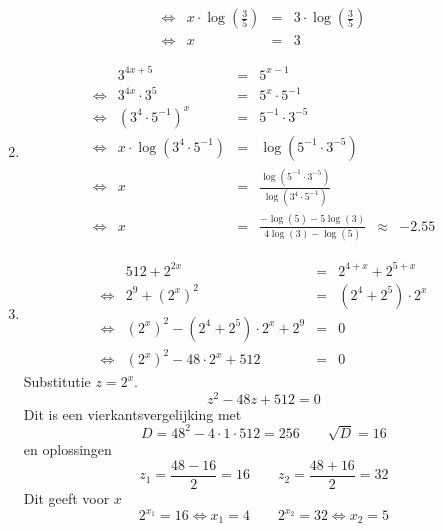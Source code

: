 \begin{oef}
\begin{opl}
\begin{enumerate}
\[\begin{array}{rrclcl}
            \iff & \displaystyle x \cdot \log\left(\frac{3}{5}\right) & = & \displaystyle 3 \cdot \log\left(\frac{3}{5}\right) \\[2mm]
            \iff & x & = & 3 
          \end{array}
        \]
  \item \[
          \begin{array}{rrclcl}
                 & 3^{4x+5} & = & 5^{x-1} \\
            \iff & 3^{4x} \cdot 3^5 & = & 5^{x} \cdot 5^{-1} \\[2mm]
            \iff & \left(3^4 \cdot 5^{-1}\right)^x & = & 5^{-1} \cdot 3^{-5} \\[2mm]
            \iff & x \cdot \log\left(3^4 \cdot 5^{-1}\right) & = & \log(5^{-1} \cdot 3^{-5}) \\[2mm]
            \iff & x & = & \displaystyle \frac{\log(5^{-1} \cdot 3^{-5})}{\log\left(3^4 \cdot 5^{-1}\right)} \\[3mm]
            \iff & x & = & \displaystyle \frac{-\log(5) - 5 \log(3)}{4\log(3) - \log(5)} & \approx & -2.55
          \end{array}
        \]
  \item \[
          \begin{array}{rrclcl}
                 & 512 + 2^{2x} & = & 2^{4+x}+2^{5+x} \\
            \iff & 2^9 + (2^x)^2 & = & (2^4 + 2^5) \cdot 2^x \\
            \iff & (2^x)^2 - (2^4 + 2^5) \cdot 2^x + 2^9 & = & 0 \\
            \iff & (2^x)^2 - 48 \cdot 2^x + 512 & = & 0
          \end{array}
        \]
        Substitutie $z = 2^x$.
        \[
          z^2 - 48 z + 512 = 0
        \]
        Dit is een vierkantsvergelijking met
        \[
          D = 48^2 - 4 \cdot 1 \cdot 512 = 256 \qquad \sqrt{D} = 16
        \]
        en oplossingen
        \[
          z_1 = \frac{48 - 16}{2} = 16 \qquad z_2 = \frac{48+16}{2} = 32
        \]
        Dit geeft voor $x$
        \[
          2^{x_1} = 16 \iff x_1 = 4 \qquad 2^{x_2} = 32 \iff x_2 = 5
        \]
\end{enumerate}
\end{opl}
\end{oef}

